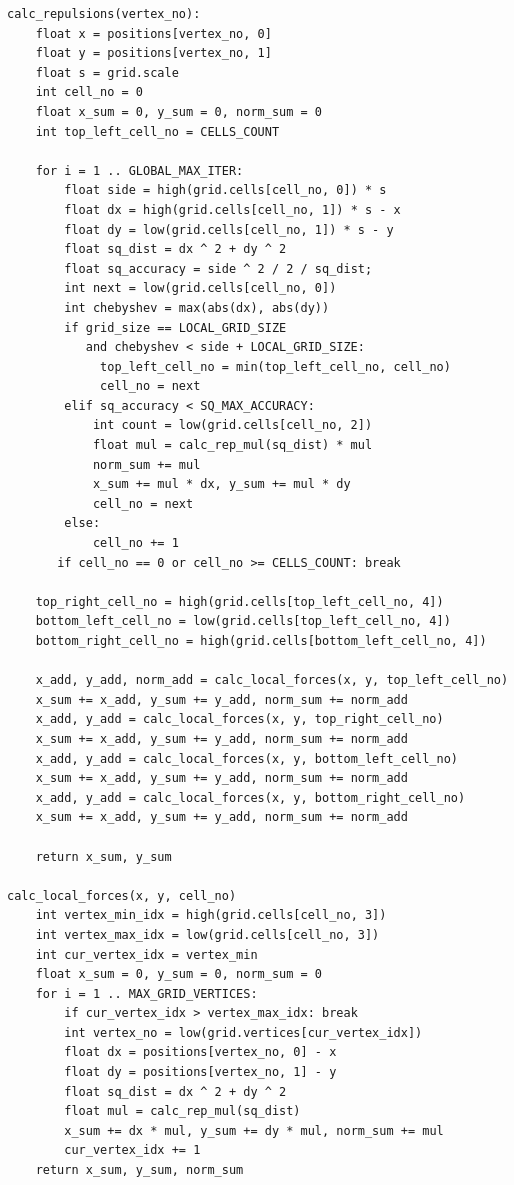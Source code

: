 \begin{verbatim}
calc_repulsions(vertex_no):
    float x = positions[vertex_no, 0]
    float y = positions[vertex_no, 1]
    float s = grid.scale
    int cell_no = 0
    float x_sum = 0, y_sum = 0, norm_sum = 0
    int top_left_cell_no = CELLS_COUNT

    for i = 1 .. GLOBAL_MAX_ITER:
        float side = high(grid.cells[cell_no, 0]) * s
        float dx = high(grid.cells[cell_no, 1]) * s - x
        float dy = low(grid.cells[cell_no, 1]) * s - y
        float sq_dist = dx ^ 2 + dy ^ 2
        float sq_accuracy = side ^ 2 / 2 / sq_dist;
        int next = low(grid.cells[cell_no, 0])
        int chebyshev = max(abs(dx), abs(dy))
        if grid_size == LOCAL_GRID_SIZE
           and chebyshev < side + LOCAL_GRID_SIZE:
             top_left_cell_no = min(top_left_cell_no, cell_no)
             cell_no = next
        elif sq_accuracy < SQ_MAX_ACCURACY:
            int count = low(grid.cells[cell_no, 2])
            float mul = calc_rep_mul(sq_dist) * mul
            norm_sum += mul
            x_sum += mul * dx, y_sum += mul * dy
            cell_no = next
        else:
            cell_no += 1
       if cell_no == 0 or cell_no >= CELLS_COUNT: break

    top_right_cell_no = high(grid.cells[top_left_cell_no, 4])
    bottom_left_cell_no = low(grid.cells[top_left_cell_no, 4])
    bottom_right_cell_no = high(grid.cells[bottom_left_cell_no, 4])

    x_add, y_add, norm_add = calc_local_forces(x, y, top_left_cell_no)
    x_sum += x_add, y_sum += y_add, norm_sum += norm_add
    x_add, y_add = calc_local_forces(x, y, top_right_cell_no)
    x_sum += x_add, y_sum += y_add, norm_sum += norm_add
    x_add, y_add = calc_local_forces(x, y, bottom_left_cell_no)
    x_sum += x_add, y_sum += y_add, norm_sum += norm_add
    x_add, y_add = calc_local_forces(x, y, bottom_right_cell_no)
    x_sum += x_add, y_sum += y_add, norm_sum += norm_add

    return x_sum, y_sum

calc_local_forces(x, y, cell_no)
    int vertex_min_idx = high(grid.cells[cell_no, 3])
    int vertex_max_idx = low(grid.cells[cell_no, 3])
    int cur_vertex_idx = vertex_min
    float x_sum = 0, y_sum = 0, norm_sum = 0
    for i = 1 .. MAX_GRID_VERTICES:
        if cur_vertex_idx > vertex_max_idx: break
        int vertex_no = low(grid.vertices[cur_vertex_idx])
        float dx = positions[vertex_no, 0] - x
        float dy = positions[vertex_no, 1] - y
        float sq_dist = dx ^ 2 + dy ^ 2
        float mul = calc_rep_mul(sq_dist)
        x_sum += dx * mul, y_sum += dy * mul, norm_sum += mul
        cur_vertex_idx += 1
    return x_sum, y_sum, norm_sum
\end{verbatim}

